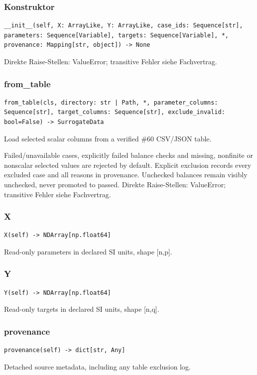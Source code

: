 \subsubsection*{Konstruktor}
\begin{lstlisting}
__init__(self, X: ArrayLike, Y: ArrayLike, case_ids: Sequence[str], parameters: Sequence[Variable], targets: Sequence[Variable], *, provenance: Mapping[str, object]) -> None
\end{lstlisting}
Direkte Raise-Stellen: ValueError; transitive Fehler siehe Fachvertrag.
\subsubsection*{from\_table}
\begin{lstlisting}
from_table(cls, directory: str | Path, *, parameter_columns: Sequence[str], target_columns: Sequence[str], exclude_invalid: bool=False) -> SurrogateData
\end{lstlisting}
Load selected scalar columns from a verified \#60 CSV/JSON table.\par Failed/unavailable cases, explicitly failed balance checks and missing, nonfinite or nonscalar selected values are rejected by default. Explicit exclusion records every excluded case and all reasons in provenance. Unchecked balances remain visibly unchecked, never promoted to passed.
Direkte Raise-Stellen: ValueError; transitive Fehler siehe Fachvertrag.
\subsubsection*{X}
\begin{lstlisting}
X(self) -> NDArray[np.float64]
\end{lstlisting}
Read-only parameters in declared SI units, shape [n,p].
\subsubsection*{Y}
\begin{lstlisting}
Y(self) -> NDArray[np.float64]
\end{lstlisting}
Read-only targets in declared SI units, shape [n,q].
\subsubsection*{provenance}
\begin{lstlisting}
provenance(self) -> dict[str, Any]
\end{lstlisting}
Detached source metadata, including any table exclusion log.

